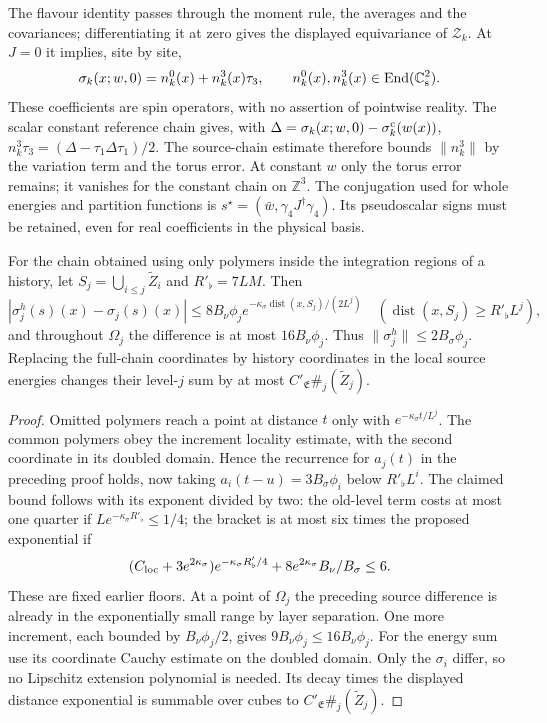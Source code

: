 \documentclass[11pt,letterpaper,reqno]{amsart}
\makeatletter
\theoremstyle{definition}
\newcommand{\ms@minorstart}{%
  \pushQED{\qed}\renewcommand{\qedsymbol}{$\blacksquare$}}
\newenvironment{lemma}[1][]{\ms@minorstart\ms@lemma[#1]}
  {\popQED\endms@lemma}
\theoremstyle{remark}
\makeatother
\begin{document}
The flavour identity passes through the moment rule, the
averages and the covariances; differentiating it at zero
gives the displayed equivariance of $\mathcal Z_k$. At $J=0$
it implies, site by site,
\[
 \sigma_k(x;w,0)=n_k^0(x)+n_k^3(x)\tau_3,
 \qquad n_k^0(x),n_k^3(x)\in\operatorname{End}(\mathbb C^2_{\rm s}).
\]
These coefficients are spin operators, with no assertion of
pointwise reality. The scalar constant reference chain gives,
with $\Delta=\sigma_k(x;w,0)-\sigma_k^{\rm c}(w(x))$,
$n_k^3\tau_3=(\Delta-\tau_1\Delta\tau_1)/2$.
The source-chain estimate therefore bounds $\|n_k^3\|$ by
the variation term and the torus error. At constant $w$ only
the torus error remains; it vanishes for the constant chain
on $\mathbb Z^3$. The conjugation used for whole energies
and partition functions is
$s^\star=(\bar w,\gamma_4J^\dagger\gamma_4)$.
Its pseudoscalar signs must be retained, even for real
coefficients in the physical basis.

\begin{lemma}[Windows along arbitrary histories]\label{C-407-21}
For the chain obtained using only polymers inside the
integration regions of a history, let
$S_j=\bigcup_{i\le j}\widetilde Z_i$ and $R'_\flat=7LM$.
Then
\[
 |\sigma_j^h(s)(x)-\sigma_j(s)(x)|
 \le8B_\nu\phi_j e^{-\kappa_\sigma
          \operatorname{dist}(x,S_j)/(2L^j)}
 \quad(\operatorname{dist}(x,S_j)\ge R'_\flat L^j),
\]
and throughout $\Omega_j$ the difference is at most
$16B_\nu\phi_j$. Thus $\|\sigma_j^h\|\le2B_\sigma\phi_j$.
Replacing the full-chain coordinates by history coordinates
in the local source energies changes their level-$j$ sum
by at most $C'_{\mathfrak E}\#_j(\widetilde Z_j)$.
\end{lemma}
\begin{proof}
Omitted polymers reach a point at distance $t$ only with
$e^{-\kappa_\sigma t/L^j}$. The common polymers obey
the increment locality estimate, with the second
coordinate in its doubled domain. Hence the recurrence
for $a_j(t)$ in the preceding proof holds, now taking
$a_i(t-u)=3B_\sigma\phi_i$ below $R'_\flat L^i$.
The claimed bound follows with its exponent divided by
two: the old-level term costs at most one quarter if
$Le^{-\kappa_\sigma R'_\flat}\le1/4$; the bracket is at
most six times the proposed exponential if
\[
 (C_{\rm loc}+3e^{2\kappa_\sigma})
 e^{-\kappa_\sigma R'_\flat/4}
       +8e^{2\kappa_\sigma}B_\nu/B_\sigma\le6.
\]
These are fixed earlier floors. At a point of $\Omega_j$
the preceding source difference is already in the
exponentially small range by layer separation. One more
increment, each bounded by $B_\nu\phi_j/2$, gives
$9B_\nu\phi_j\le16B_\nu\phi_j$.
For the energy sum use its coordinate Cauchy estimate on
the doubled domain. Only the $\sigma_i$ differ, so no
Lipschitz extension polynomial is needed. Its decay
times the displayed distance exponential is summable
over cubes to $C'_{\mathfrak E}\#_j(\widetilde Z_j)$.
\end{proof}
\end{document}
